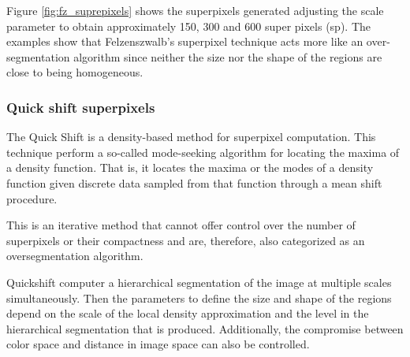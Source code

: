 Figure \ref{fig:fz_suprepixels} shows the superpixels generated adjusting the scale parameter to obtain approximately 150, 300 and 600 super pixels (sp). The examples show that Felzenszwalb's superpixel technique acts more like an over-segmentation algorithm since neither the size nor the shape of the regions are close to being homogeneous. 
 

\subsubsection{Quick shift superpixels} %

The Quick Shift \citep{Vedaldi.Soatto:ECCV:2008} is a density-based method for superpixel computation. This technique perform a so-called mode-seeking algorithm \citep{YizongCheng:PAMI:1995} for locating the maxima of a density function. That is, it locates the maxima or the modes of a density function given discrete data sampled from that function through a mean shift procedure.

This is an iterative method that cannot offer control over the number of superpixels or their compactness and are, therefore, also categorized as an oversegmentation algorithm.

Quickshift computer a hierarchical segmentation of the image at multiple scales simultaneously. Then the parameters to define the size and shape of the regions depend on the scale of the local density approximation and the level in the hierarchical segmentation that is produced. Additionally, the compromise between color space and distance in image space can also be controlled. 

